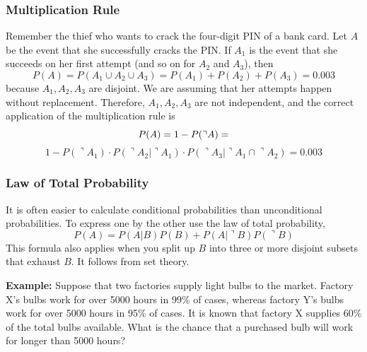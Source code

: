 \documentclass[xcolor=dvipsnames]{beamer}
\begin{document}
\begin{frame}
  \frametitle{Multiplication Rule}
  Remember the thief who wants to crack the four-digit PIN of a bank
  card. Let $A$ be the event that she successfully cracks the PIN. If
  $A_{1}$ is the event that she succeeds on her first attempt (and so
  on for $A_{2}$ and $A_{3}$), then
\begin{equation}
  \label{eq:ragheidu}
  P(A)=P(A_{1}\cup{}A_{2}\cup{}A_{3})=P(A_{1})+P(A_{2})+P(A_{3})=0.003
\end{equation}
because $A_{1},A_{2},A_{3}$ are disjoint. We are assuming that her
attempts happen \alert{without replacement}. Therefore,
$A_{1},A_{2},A_{3}$ are not independent, and the correct application of
the multiplication rule is
\begin{equation}
  \label{eq:mohghunu}
  P(A)=1-P(\urcorner{}A)=\notag
\end{equation}
\begin{equation}
  \label{eq:yoobaegh}
  1-P(\urcorner{}A_{1})\cdot{}P(\urcorner{}A_{2}|\urcorner{}A_{1})\cdot{}P(\urcorner{}A_{3}|\urcorner{}A_{1}\cap{}\urcorner{}A_{2})=0.003
\end{equation}
\end{frame}

\begin{frame}
  \frametitle{Law of Total Probability}
It is often easier to calculate conditional probabilities than
unconditional probabilities. To express one by the other use the
\alert{law of total probability},
\begin{equation}
  \label{eq:aefengah}
  P(A)=P(A|B)P(B)+P(A|\urcorner{}B)P(\urcorner{}B)
\end{equation}
This formula also applies when you split up $B$ into three or more
disjoint subsets that exhaust $B$. It follows from set theory.

\bigskip

\textbf{Example: }Suppose that two factories supply light bulbs to the
market. Factory X's bulbs work for over 5000 hours in 99\% of cases,
whereas factory Y's bulbs work for over 5000 hours in 95\% of cases.
It is known that factory X supplies 60\% of the total bulbs available.
What is the chance that a purchased bulb will work for longer than
5000 hours?
\end{frame}
\end{document}
